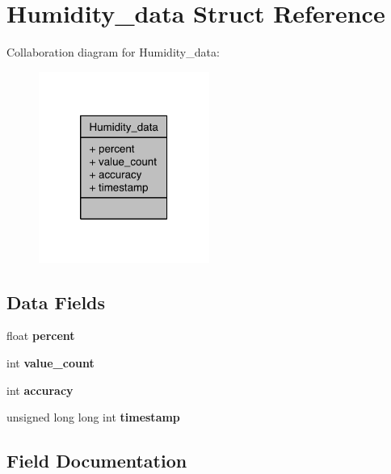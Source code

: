\section{Humidity\-\_\-data Struct Reference}
\label{structHumidity__data}


Collaboration diagram for Humidity\-\_\-data\-:\nopagebreak
\begin{figure}[H]
\begin{center}
\leavevmode
\includegraphics[width=158pt]{structHumidity__data__coll__graph}
\end{center}
\end{figure}
\subsection*{Data Fields}
\begin{DoxyCompactItemize}
\item 
float {\bfseries percent}\label{structHumidity__data_a1ae3cb64c62f7d0c1d33c1147383a6a6}

\item 
int {\bfseries value\-\_\-count}\label{structHumidity__data_a58b34e76f7f0a9f1d27700fd12915433}

\item 
int {\bfseries accuracy}\label{structHumidity__data_ab9f57bcf33492a14b8f8152ae0711f1b}

\item 
unsigned long long int {\bfseries timestamp}\label{structHumidity__data_a42c9802cb7bdb42118fe789b15ee5bb7}

\end{DoxyCompactItemize}


\subsection{Field Documentation}
